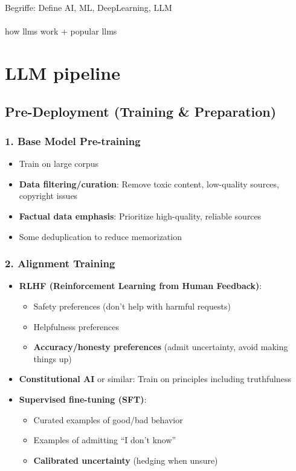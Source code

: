
Begriffe: Define AI, ML, DeepLearning, LLM\\
\cite{stoffelbauer_how_2023}\\

how llms work + popular llms

\section{LLM pipeline}

\subsection{Pre-Deployment (Training \& Preparation)}

\subsubsection{1. Base Model Pre-training}
\begin{itemize}[leftmargin=*]
    \item Train on large corpus
    \item \textbf{Data filtering/curation}: Remove toxic content, low-quality sources, copyright issues
    \item \textbf{Factual data emphasis}: Prioritize high-quality, reliable sources
    \item Some deduplication to reduce memorization
\end{itemize}

\subsubsection{2. Alignment Training }
\begin{itemize}[leftmargin=*]
    \item \textbf{RLHF (Reinforcement Learning from Human Feedback)}:
    \begin{itemize}
        \item Safety preferences (don't help with harmful requests)
        \item Helpfulness preferences
        \item \textbf{Accuracy/honesty preferences} (admit uncertainty, avoid making things up)
    \end{itemize}
    \item \textbf{Constitutional AI} or similar: Train on principles including truthfulness
    \item \textbf{Supervised fine-tuning (SFT)}:
    \begin{itemize}
        \item Curated examples of good/bad behavior
        \item Examples of admitting ``I don't know''
        \item \textbf{Calibrated uncertainty} (hedging when unsure)
    \end{itemize}
\end{itemize}


